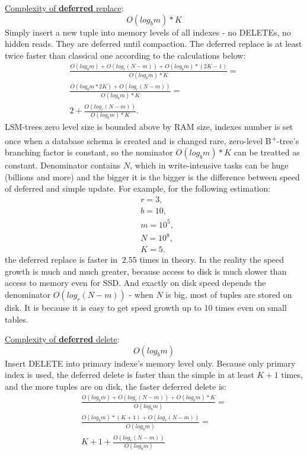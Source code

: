 \documentclass{vldb}
\begin{document}
\underline{Complexity of \textbf{deferred} replace}:
\begin{displaymath}
O(log_bm) * K
\end{displaymath}
Simply insert a new tuple into memory levels of all indexes - no DELETEs, no
hidden reads. They are deferred until compaction. The deferred replace is at
least twice faster than classical one according to the calculations below:
\begin{gather*}
\frac{O(log_bm) + O(log_r(N - m)) + O(log_bm) * (2K - 1)}{O(log_bm) * K} = \\
\frac{O(log_bm * 2K) + O(log_r(N - m))}{O(log_bm) * K} = \\
2 + \frac{O(log_r(N - m))}{O(log_bm) * K}.
\end{gather*}
LSM-trees zero level size is bounded above by RAM size, indexes number is set
once when a database schema is created and is changed rare, zero-level
B\textsuperscript{+}-tree's branching factor is constant, so the nominator
$O(log_bm) * K$ can be treatted as constant. Denominator contains $N$, which
in write-intensive tasks can be huge (billions and more) and the bigger it is
the bigger is the difference between speed of deferred and simple update.
For example, for the following estimation:
\begin{align*}
&r = 3, \\
&b = 10, \\
&m = 10^5, \\
&N = 10^8, \\
&K = 5.
\end{align*}
the deferred replace is faster in $~2.55$ times in theory. In the reality the
speed growth is much and much greater, because access to disk is much slower
than access to memory even for SSD. And exactly on disk speed depends the
denominator $O(log_r(N - m))$ - when $N$ is big, most of tuples are stored on
disk. It is because it is easy to get speed growth up to 10 times even on small
tables.

\underline{Complexity of \textbf{deferred} delete}:
\begin{displaymath}
O(log_bm)
\end{displaymath}
Insert DELETE into primary indexe's memory level only. Because only primary
index is used, the deferred delete is faster than the simple in at least $K + 1$
times, and the more tuples are on disk, the faster deferred delete is:
\begin{gather*}
\frac{O(log_bm) + O(log_r(N-m)) + O(log_bm) * K}{O(log_bm)} = \\
\frac{O(log_bm)*(K + 1) + O(log_r(N-m))}{O(log_bm)} = \\
K + 1 + \frac{O(log_r(N-m))}{O(log_bm)}
\end{gather*}
\end{document}
